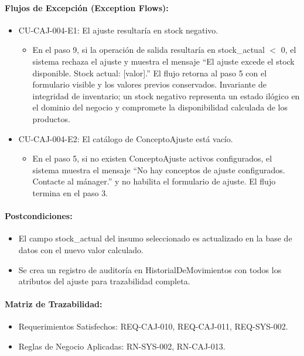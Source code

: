 \paragraph{Flujos de Excepción (Exception Flows):}
\begin{itemize}
    \item CU-CAJ-004-E1: El ajuste resultaría en stock negativo.
    \begin{itemize}
        \item En el paso 9, si la operación de salida resultaría en stock\_actual $<$ 0, el sistema rechaza el ajuste y muestra el mensaje ``El ajuste excede el stock disponible. Stock actual: [valor].'' El flujo retorna al paso 5 con el formulario visible y los valores previos conservados. Invariante de integridad de inventario; un stock negativo representa un estado ilógico en el dominio del negocio y compromete la disponibilidad calculada de los productos.
    \end{itemize}
    \item CU-CAJ-004-E2: El catálogo de ConceptoAjuste está vacío.
    \begin{itemize}
        \item En el paso 5, si no existen ConceptoAjuste activos configurados, el sistema muestra el mensaje ``No hay conceptos de ajuste configurados. Contacte al mánager.'' y no habilita el formulario de ajuste. El flujo termina en el paso 3.
    \end{itemize}
\end{itemize}

\paragraph{Postcondiciones:}
\begin{itemize}
    \item El campo stock\_actual del insumo seleccionado es actualizado en la base de datos con el nuevo valor calculado.
    \item Se crea un registro de auditoría en HistorialDeMovimientos con todos los atributos del ajuste para trazabilidad completa.
\end{itemize}

\paragraph{Matriz de Trazabilidad:}
\begin{itemize}
    \item Requerimientos Satisfechos: REQ-CAJ-010, REQ-CAJ-011, REQ-SYS-002.
    \item Reglas de Negocio Aplicadas: RN-SYS-002, RN-CAJ-013.
\end{itemize}

